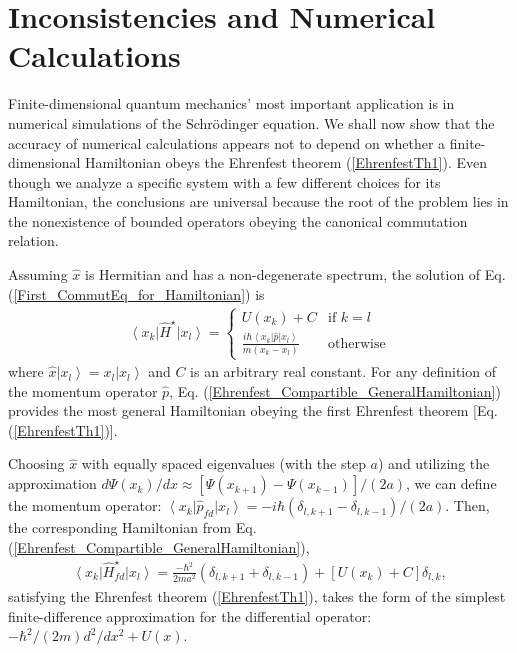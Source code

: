 \documentclass[twocolumn,pra,aps,showpacs,preprintnumbers,nofootinbib, superscriptaddress, amsmath,amssymb]{revtex4}
\newcommand*{\bra}[1]{\left\langle{#1}\right|}
\newcommand*{\ket}[1]{\left| #1 \right\rangle}
\begin{document}
\section{Inconsistencies and Numerical Calculations}

Finite-dimensional quantum mechanics' most important application is in numerical simulations of the Schr\"{o}dinger equation. We shall now show that the accuracy of numerical calculations appears not to depend on whether a finite-dimensional Hamiltonian obeys the Ehrenfest theorem (\ref{EhrenfestTh1}). Even though we analyze a specific system with a few different choices for its Hamiltonian, the conclusions are universal because the root of the problem lies in the nonexistence of bounded operators obeying the canonical commutation relation. 

Assuming $\hat{x}$ is Hermitian and has a non-degenerate spectrum, the solution of Eq. (\ref{First_CommutEq_for_Hamiltonian}) is
\begin{align}\label{Ehrenfest_Compartible_GeneralHamiltonian}
	\bra{x_k} \hat{H}^{\star} \ket{x_l} = \left\{
		\begin{array}{ll}
			U(x_k) + C & \mbox{if } k=l \\
			\frac{i \hbar \bra{x_k} \hat{p} \ket{x_l} }{m(x_k - x_l)} &\mbox{otherwise}
		\end{array}
	\right.
\end{align}
where $\hat{x} \ket{x_l} = x_l \ket{x_l}$ and $C$ is an arbitrary real constant. For any definition of the momentum operator $\hat{p}$, Eq. (\ref{Ehrenfest_Compartible_GeneralHamiltonian}) provides the most general Hamiltonian obeying the first Ehrenfest theorem [Eq. (\ref{EhrenfestTh1})].

Choosing $\hat{x}$ with equally spaced eigenvalues (with the step $a$) and utilizing the approximation $d \Psi(x_k) /dx \approx [ \Psi(x_{k+1}) - \Psi(x_{k-1}) ] / (2a)$, we can define the momentum operator: $\bra{x_k} \hat{p}_{fd} \ket{x_l} = -i\hbar\left( \delta_{l,k+1} - \delta_{l,k-1} \right)/(2a)$. Then, the corresponding Hamiltonian from Eq. (\ref{Ehrenfest_Compartible_GeneralHamiltonian}), 
\begin{align}\label{FiniteDiff_approx_Hamiltonian}
	\bra{x_k} \hat{H}^{\star}_{fd} \ket{x_l} = \frac{-\hbar^2}{2ma^2} \left( \delta_{l,k+1} + \delta_{l,k-1} \right) +  [U(x_k) + C]\delta_{l,k},
\end{align}
satisfying the Ehrenfest theorem (\ref{EhrenfestTh1}), takes the form of the simplest finite-difference approximation for the differential operator: $-\hbar^2/(2m) d^2/dx^2 + U(x)$. 
\end{document}
